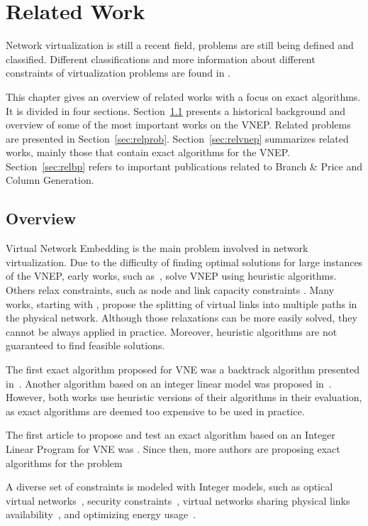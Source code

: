 \chapter{Related Work}
\label{ch:relwork}

Network virtualization is still a recent field, problems are still being defined and classified. Different classifications and more information about different constraints of virtualization problems are found in \cite{Fischer:2011,Chowdhury2010,FischerSurvey}.

This chapter gives an overview of related works with a focus on exact algorithms. It  is divided in four sections.
Section~\ref{sec:overview} presents a historical background and overview of some of the most important works on the VNEP.
Related problems are presented in Section~\ref{sec:relprob}.
Section~\ref{sec:relvnep} summarizes related works, mainly those that contain exact algorithms for the VNEP.
Section~\ref{sec:relbp} refers to important publications related to Branch \& Price and Column Generation.

\section{Overview}
\label{sec:overview}
Virtual Network Embedding is the main problem involved in network virtualization.
Due to the difficulty of finding optimal solutions for large instances of the VNEP, early works, such as~\cite{Zhu:2006}, solve VNEP using heuristic algorithms. Others relax constraints, such as node and link capacity constraints \cite{Fan06}. Many works, starting with \cite{Yu2008}, propose the splitting of virtual links into multiple paths in the physical network. Although those relaxations can be more easily solved, they cannot be always applied in practice. Moreover, heuristic algorithms are not guaranteed to find feasible solutions. 

The first exact algorithm proposed for VNE was a backtrack algorithm presented in~\cite{Lischka:2009}.
Another algorithm based on an integer linear model was proposed in~\cite{Chowdhury:2012}.
However, both works use heuristic versions of their algorithms in their evaluation, as exact algorithms are deemed too expensive to be used in practice.

The first article to propose and test an exact algorithm based on an Integer Linear Program for VNE was \cite{Houidi:2011}. Since then, more authors are proposing exact algorithms for the problem

A diverse set of constraints is modeled with Integer models, such as optical virtual networks~\cite{Pages:2012}, security constraints~\cite{Buriol:2012}, virtual networks sharing physical links availability~\cite{Trinh:2011}, and optimizing energy usage~\cite{Botero:2012}.


